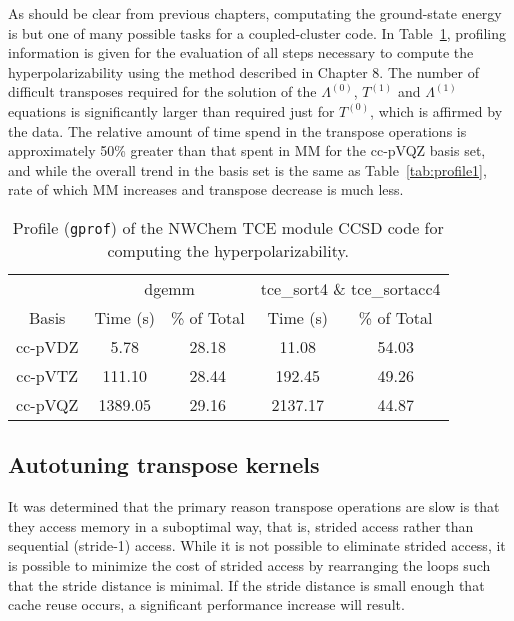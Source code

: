 \documentclass[letterpaper,12pt]{article}
\begin{document}
As should be clear from previous chapters, computating the ground-state energy is but one of many possible tasks for a coupled-cluster code.  In Table~\ref{tab:profile2}, profiling information is given for the evaluation of all steps necessary to compute the hyperpolarizability using the method described in Chapter 8.  The number of difficult transposes required for the solution of the $\Lambda^{(0)}$, $T^{(1)}$ and $\Lambda^{(1)}$ equations is significantly larger than required just for $T^{(0)}$, which is affirmed by the data.  The relative amount of time spend in the transpose operations is approximately 50\% greater than that spent in MM for the cc-pVQZ basis set, and while the overall trend in the basis set is the same as Table~\ref{tab:profile1}, rate of which MM increases and transpose decrease is much less.

\begin{table}
\caption{Profile (\texttt{gprof}) of the NWChem TCE module CCSD code for computing the hyperpolarizability.} \label{tab:profile2}
\begin{center}
\begin{tabular}{ccccc}
\hline\hline
 & \multicolumn{2}{c}{dgemm} & \multicolumn{2}{c}{tce\_sort4 \& tce\_sortacc4} \\
   \cline{2-3} \cline{4-5}
Basis & Time (s) & \% of Total & Time (s) & \% of Total \\
\hline
cc-pVDZ &    5.78 & 28.18 &   11.08 & 54.03 \\
cc-pVTZ &  111.10 & 28.44 &  192.45 & 49.26 \\
cc-pVQZ & 1389.05 & 29.16 & 2137.17 & 44.87 \\
\hline\hline
\end{tabular}
\end{center}
\end{table}

\subsection{Autotuning transpose kernels}

It was determined that the primary reason transpose operations are slow is that they access memory in a suboptimal way, that is, strided access rather than sequential (stride-1) access.  While it is not possible to eliminate strided access, it is possible to minimize the cost of strided access by rearranging the loops such that the stride distance is minimal.  If the stride distance is small enough that cache reuse occurs, a significant performance increase will result.
\end{document}
